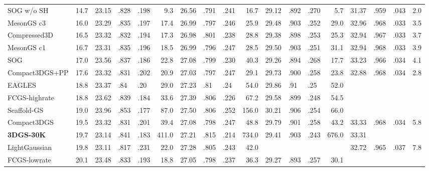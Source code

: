 {\begin{minipage}{\textheight}
\begin{adjustbox}{center}
\begin{tabular}{ll|lllr|lllr|lllr|lllr}
SOG w/o SH & 14.7 & 23.15 & .828 & .198 & 9.3 & 26.56 & .791 & .241 & 16.7 & 29.12 & .892 & .270 & 5.7 & 31.37 & .959 & .043 & 2.0 \\
MesonGS c3 & 16.0 & 23.29 & .835 & .197 & 17.4 & 26.99 & .797 & .246 & 25.9 & 29.48 & .903 & .252 & 29.0 & 32.96 & \cellcolor{lightorange}.968 & \cellcolor{lightred}.033 & 3.5 \\
Compressed3D & 16.5 & 23.32 & .832 & .194 & 17.3 & 26.98 & .801 & .238 & 28.8 & 29.38 & .898 & .253 & 25.3 & 32.94 & \cellcolor{lightyellow}.967 & \cellcolor{lightred}.033 & 3.7 \\
MesonGS c1 & 16.7 & 23.31 & .835 & .196 & 18.5 & 26.99 & .796 & .247 & 28.5 & 29.50 & .903 & .251 & 31.1 & 32.94 & \cellcolor{lightorange}.968 & \cellcolor{lightred}.033 & 3.9 \\
SOG & 17.0 & 23.56 & .837 & .186 & 22.8 & 27.08 & .799 & .230 & 40.3 & 29.26 & .894 & .268 & 17.7 & 33.23 & .966 & \cellcolor{lightorange}.034 & 4.1 \\
Compact3DGS+PP & 17.6 & 23.32 & .831 & .202 & 20.9 & 27.03 & .797 & .247 & 29.1 & 29.73 & .900 & .258 & 23.8 & 32.88 & \cellcolor{lightorange}.968 & \cellcolor{lightorange}.034 & 2.8 \\
EAGLES & 18.8 & 23.37 & .84 & .20 & 29.0 & 27.23 & .81 & .24 & 54.0 & 29.86 & \cellcolor{lightorange}.91 & .25 & 52.0 &  &  &  &  \\
FCGS-highrate & 18.8 & 23.62 & .839 & .184 & 33.6 & 27.39 & .806 & \cellcolor{lightorange}.226 & 67.2 & 29.58 & .899 & \cellcolor{lightorange}.248 & 54.5 &  &  &  &  \\
Scaffold-GS & 19.0 & 23.96 & .853 & \cellcolor{lightyellow}.177 & 87.0 & 27.50 & .806 & .252 & 156.0 & 30.21 & .906 & .254 & 66.0 &  &  &  &  \\
Compact3DGS & 19.5 & 23.32 & .831 & .201 & 39.4 & 27.08 & .798 & .247 & 48.8 & 29.79 & .901 & .258 & 43.2 & 33.33 & \cellcolor{lightorange}.968 & \cellcolor{lightorange}.034 & 5.8 \\
\textbf{3DGS-30K} & 19.7 & 23.14 & .841 & .183 & 411.0 & 27.21 & \cellcolor{lightred}.815 & \cellcolor{lightred}.214 & 734.0 & 29.41 & .903 & \cellcolor{lightred}.243 & 676.0 & 33.31 &  &  &  \\
LightGaussian & 19.8 & 23.11 & .817 & .231 & 22.0 & 27.28 & .805 & .243 & 42.0 &  &  &  &  & 32.72 & .965 & .037 & 7.8 \\
FCGS-lowrate & 20.1 & 23.48 & .833 & .193 & 18.8 & 27.05 & .798 & .237 & 36.3 & 29.27 & .893 & .257 & 30.1 &  &  &  &  \\

\end{tabular}
\end{adjustbox}
\end{minipage}}
